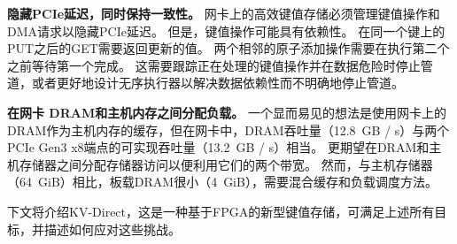 \textbf {隐藏PCIe延迟，同时保持一致性。}
网卡上的高效键值存储必须管理键值操作和DMA请求以隐藏PCIe延迟。
但是，键值操作可能具有依赖性。
在同一个键上的PUT之后的GET需要返回更新的值。
两个相邻的原子添加操作需要在执行第二个之前等待第一个完成。
这需要跟踪正在处理的键值操作并在数据危险时停止管道，或者更好地设计无序执行器以解决数据依赖性而不明确地停止管道。


\textbf {在网卡 DRAM和主机内存之间分配负载。}
一个显而易见的想法是使用网卡上的DRAM作为主机内存的缓存，但在网卡中，DRAM吞吐量（12.8~GB / s）与两个PCIe Gen3 x8端点的可实现吞吐量（13.2~GB / s）相当。 
更期望在DRAM和主机存储器之间分配存储器访问以便利用它们的两个带宽。
然而，与主机存储器（64~GiB）相比，板载DRAM很小（4~GiB），需要混合缓存和负载调度方法。

下文将介绍KV-Direct，这是一种基于FPGA的新型键值存储，可满足上述所有目标，并描述如何应对这些挑战。
